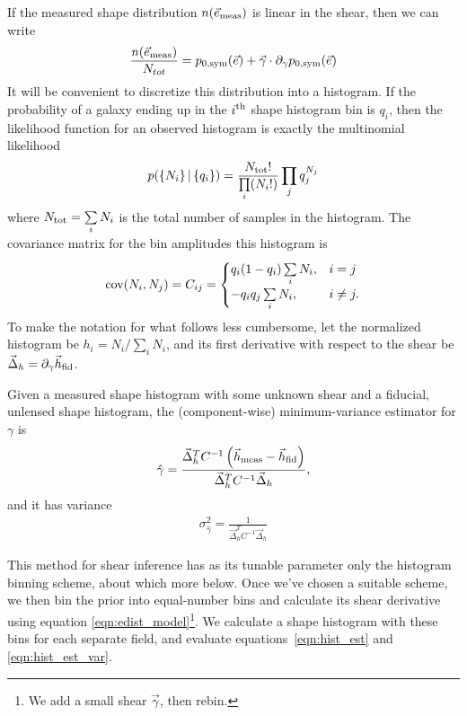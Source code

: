 \documentclass[iop]{emulateapj}
\begin{document}
If the measured shape distribution $n(\vec{e}_{\rm meas})$ is linear
in the shear, then we can write
\begin{align}
\frac{n(\vec{e}_{\rm meas})}{N_{tot}} = p_{0,\rm sym}(\vec{e}) + \vec{\gamma}\cdot \partial_{\gamma} p_{0,\rm sym}(\vec{e})
\end{align}
It will be convenient to discretize this distribution into a
histogram. If the probability of a galaxy ending up in the $i^{\rm
  th}$ shape histogram bin is $q_i$, then the likelihood function for
an observed histogram is exactly the multinomial likelihood
\begin{align}
p( \left\{N_i\right\} |\left\{ q_i\right\} ) = \frac{N_{\rm tot}!}{\prod\limits_i (N_i!)}\prod\limits_j q_j^{N_j}
\label{eqn:multnomial}
\end{align}
where $N_{\rm tot} = \sum\limits_i N_i$ is the total number of samples
in the histogram.  The covariance matrix for the bin amplitudes this
histogram is
\begin{align}
{\rm cov}(N_i, N_j) = C_{ij} = \begin{cases}
  q_i(1-q_i)\sum\limits_i N_i, & i=j \\
  -q_iq_j \sum\limits_i N_i, & i \neq j.
\end{cases}
\end{align}
To make the notation for what follows less cumbersome, let the
normalized histogram be $h_i = N_i / \sum\limits_i N_i$, and its first
derivative with respect to the shear be
$\vec{\Delta}_h=\partial_{\gamma}\vec{h}_{\rm fid}$.

Given a measured shape histogram with some unknown shear and a
fiducial, unlensed shape histogram, the (component-wise)
minimum-variance estimator for $\gamma$ is
\begin{align}
\hat{\gamma} = \frac{\vec{\Delta}_h^T C^{-1}\left( \vec{h}_{\rm meas} - \vec{h}_{\rm fid}\right)} {\vec{\Delta}_h^TC^{-1}\vec{\Delta}_h},
\label{eqn:hist_est}
\end{align}
and it has variance
\begin{align}
\sigma^2_{\hat{\gamma}} = \frac{1}{\vec{\Delta}_h^TC^{-1}\vec{\Delta}_h}
\label{eqn:hist_est_var}
\end{align}

This method for shear inference has as its tunable parameter only the
histogram binning scheme, about which more below. Once we've chosen a
suitable scheme, we then bin the prior into equal-number bins and
calculate its shear derivative using equation
\ref{eqn:edist_model}\footnote{We add a small shear $\vec{\gamma}$,
  then rebin.}. We calculate a shape histogram with these bins for
each separate field, and evaluate equations~\ref{eqn:hist_est} and
\ref{eqn:hist_est_var}.
\end{document}
